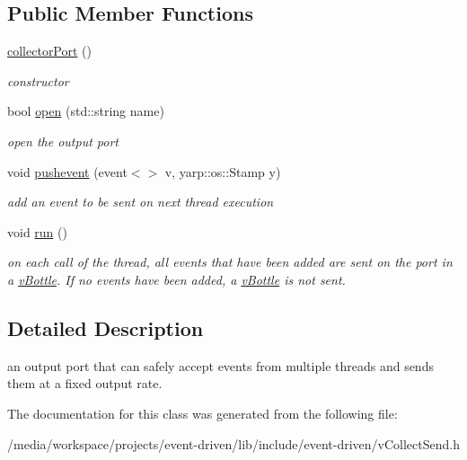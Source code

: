 \subsection*{Public Member Functions}
\begin{DoxyCompactItemize}
\item 
\mbox{\label{classev_1_1collectorPort_ac7cd1de9c40bd46df66b67ae824bb258}} 
\hyperlink{classev_1_1collectorPort_ac7cd1de9c40bd46df66b67ae824bb258}{collector\+Port} ()
\begin{DoxyCompactList}\small\item\em constructor \end{DoxyCompactList}\item 
\mbox{\label{classev_1_1collectorPort_a164072ae38c4e115873c451984b8e7f4}} 
bool \hyperlink{classev_1_1collectorPort_a164072ae38c4e115873c451984b8e7f4}{open} (std\+::string name)
\begin{DoxyCompactList}\small\item\em open the output port \end{DoxyCompactList}\item 
\mbox{\label{classev_1_1collectorPort_ab1d587f6b728b65b22df73bbe674607d}} 
void \hyperlink{classev_1_1collectorPort_ab1d587f6b728b65b22df73bbe674607d}{pushevent} (event$<$$>$ v, yarp\+::os\+::\+Stamp y)
\begin{DoxyCompactList}\small\item\em add an event to be sent on next thread execution \end{DoxyCompactList}\item 
\mbox{\label{classev_1_1collectorPort_a7ec227ae78ec71ca8867a20ae815ea7d}} 
void \hyperlink{classev_1_1collectorPort_a7ec227ae78ec71ca8867a20ae815ea7d}{run} ()
\begin{DoxyCompactList}\small\item\em on each call of the thread, all events that have been added are sent on the port in a \hyperlink{classev_1_1vBottle}{v\+Bottle}. If no events have been added, a \hyperlink{classev_1_1vBottle}{v\+Bottle} is not sent. \end{DoxyCompactList}\end{DoxyCompactItemize}


\subsection{Detailed Description}
an output port that can safely accept events from multiple threads and sends them at a fixed output rate. 

The documentation for this class was generated from the following file\+:\begin{DoxyCompactItemize}
\item 
/media/workspace/projects/event-\/driven/lib/include/event-\/driven/v\+Collect\+Send.\+h\end{DoxyCompactItemize}
